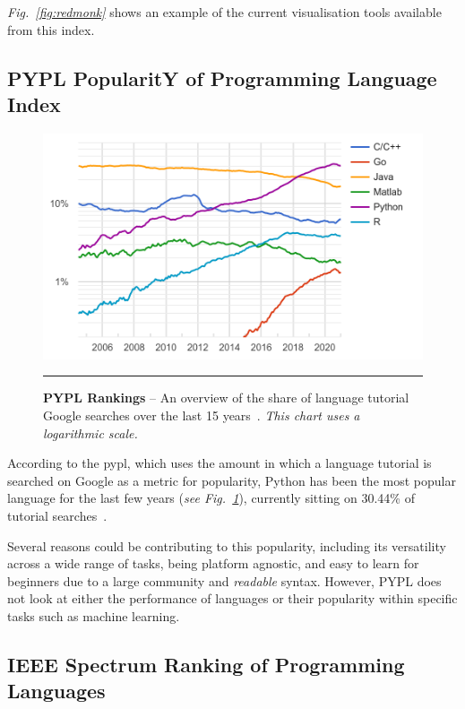 \textit{Fig.~\ref{fig:redmonk}} shows an example of the current visualisation tools available from this index.


\subsection{PYPL PopularitY of Programming Language Index}

\begin{figure}[H]
	\centering
        \includegraphics[width=1.0\textwidth]{media/literature/pypl.png}
        \rule{35em}{0.5pt}
        \caption[PYPL PopularitY of Programming Language Index]{\textbf{PYPL Rankings} -- An overview of the share of language tutorial Google searches over the last 15 years~\citep{pypl}. \textit{This chart uses a logarithmic scale.}}\label{fig:pypl}
\end{figure}

According to the \Gls{pypl}, which uses the amount in which 
a language tutorial is searched on Google as a metric for popularity, Python has been the most popular language
for the last few years (\textit{see Fig.~\ref{fig:pypl}}), currently sitting on 30.44\% of tutorial searches~\citep{pypl}.

Several reasons could be contributing to this popularity, including its versatility across a wide range
of tasks, being platform agnostic, and easy to learn for beginners due to a large community and \textit{readable} syntax. However,
PYPL does not look at either the performance of languages or their popularity within specific tasks such as machine learning.
\subsection{IEEE Spectrum Ranking of Programming Languages}

